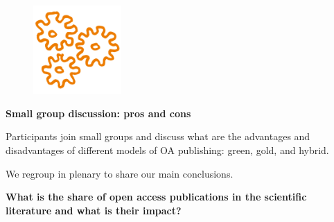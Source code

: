 \documentclass{beamer}
\begin{document}
\begin{frame}{}
\begin{figure}
\includegraphics[width=0.3\textwidth]{hb_2.png}
\end{figure}
\begin{center}
	\textbf{\large Small group discussion: pros and cons}
    
	Participants join small groups and discuss what are the advantages and disadvantages of different models of OA publishing: green, gold, and hybrid.

	We regroup in plenary to share our main conclusions.
\end{center}
\end{frame}


\begin{frame}{}
\begin{center}
	\textbf{\large What is the share of open access publications in the scientific literature and what is their impact?}
\end{center}
\end{frame}

\end{document}
